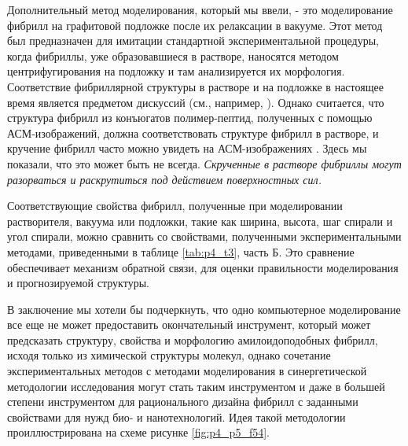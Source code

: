     Дополнительный метод моделирования, который мы ввели, - это моделирование фибрилл на графитовой подложке после их релаксации в вакууме. Этот метод был предназначен для имитации стандартной экспериментальной процедуры, когда фибриллы, уже образовавшиеся в растворе, наносятся методом центрифугирования на подложку и там анализируется их морфология. Соответствие фибриллярной структуры в растворе и на подложке в настоящее время является предметом дискуссий (см., например, \cite{borner_organization_2008}). Однако считается, что структура фибрилл из конъюгатов полимер-пептид, полученных с помощью АСМ-изображений, должна соответствовать структуре фибрилл в растворе, и кручение фибрилл часто можно увидеть на АСМ-изображениях \cite{diegelmann_one-dimensional_2008,schillinger_oligothiophene_2009}. Здесь мы показали, что это может быть не всегда. \textit{Скрученные в растворе фибриллы могут разорваться и раскрутиться под действием поверхностных сил.}
    
    Соответствующие свойства фибрилл, полученные при моделировании растворителя, вакуума или подложки, такие как ширина, высота, шаг спирали и угол спирали, можно сравнить со свойствами, полученными экспериментальными методами, приведенными в таблице \ref{tab:p4_t3}, часть Б. Это сравнение обеспечивает механизм обратной связи, для оценки правильности моделирования и прогнозируемой структуры.
    
    В заключение мы хотели бы подчеркнуть, что одно компьютерное моделирование все еще не может предоставить окончательный инструмент, который может предсказать структуру, свойства и морфологию амилоидоподобных фибрилл, исходя только из химической структуры молекул, однако сочетание экспериментальных методов с методами моделирования в синергетической методологии исследования могут стать таким инструментом и даже в большей степени инструментом для рационального дизайна фибрилл с заданными свойствами для нужд био- и нанотехнологий. Идея такой методологии проиллюстрирована на схеме рисунке \ref{fig:p4_p5_f54}.
    
